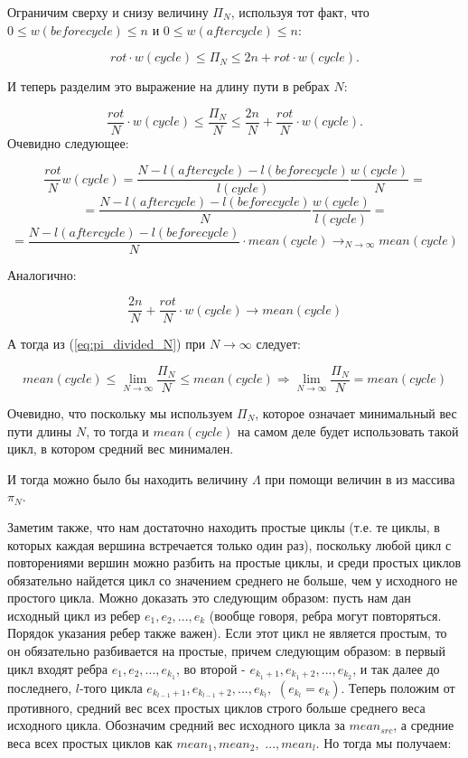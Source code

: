 \documentclass[a4paper,12pt]{report}
\theoremstyle{plain} %
\theoremstyle{definition}
\theoremstyle{remark}
\begin{document}
\begin{large}
Ограничим сверху и снизу величину $\Pi_N$, используя тот факт, что $0 \le w(beforecycle) \le n$ и $0 \le w(aftercycle) \le n$:

$$rot \cdot w(cycle) \le \Pi_N \le 2n + rot \cdot w(cycle).$$

И теперь разделим это выражение на длину пути в ребрах $N$:

\begin{equation}\label{eq:pi_divided_N}
\frac{rot}{N} \cdot w(cycle) \le \frac{\Pi_N}{N} \le \frac{2n}{N} + \frac{rot}{N} \cdot w(cycle).\end{equation}
Очевидно следующее:

$$\frac{rot}{N} w(cycle) = \frac{N - l(aftercycle) - l(beforecycle)}{l(cycle)}\frac{w(cycle)}{N}=$$
$$=\frac{N - l(aftercycle) - l(beforecycle)}{N}\frac{w(cycle)}{l(cycle)} =$$
$$= \frac{N - l(aftercycle) - l(beforecycle)}{N} \cdot mean(cycle) \rightarrow_{N \rightarrow \infty} mean(cycle)$$

Аналогично:

$$\frac{2n}{N} + \frac{rot}{N} \cdot w(cycle) \rightarrow mean(cycle)$$

А тогда из (\ref{eq:pi_divided_N}) при $N \rightarrow \infty$ следует:

$$mean(cycle) \le \lim_{N \rightarrow \infty} \frac{\Pi_N}{N} \le mean(cycle) \Rightarrow \lim_{N \rightarrow \infty}\frac{\Pi_N}{N} = mean(cycle)$$

Очевидно, что поскольку мы используем $\Pi_N$, которое означает минимальный вес пути длины $N$, то тогда и $mean(cycle)$ на самом деле будет использовать такой цикл, в котором средний вес минимален.

И тогда можно было бы находить величину $\Lambda$ при помощи величин в из массива $\pi_N$.

Заметим также, что нам достаточно находить простые циклы (т.е. те циклы, в которых каждая вершина встречается только один раз), поскольку любой цикл с повторениями вершин можно разбить на простые циклы, и среди простых циклов обязательно найдется цикл со значением среднего не больше, чем у исходного не простого цикла. Можно доказать это следующим образом: пусть нам дан исходный цикл из ребер $e_1, e_2, ..., e_k$ (вообще говоря, ребра могут повторяться. Порядок указания ребер также важен). Если этот цикл не является простым, то он обязательно разбивается на простые, причем следующим образом: в первый цикл входят ребра $e_1, e_2, ..., e_{k_1}$, во второй - $e_{k_1+1}, e_{k_1+2}, ..., e_{k_2}$, и так далее до последнего, $l$-того цикла $e_{k_{l-1}+1}, e_{k_{l-1}+2}, ..., e_{k_l},$ $(e_{k_l} = e_k)$.  Теперь положим от противного, средний вес всех простых циклов строго больше среднего веса исходного цикла. Обозначим средний вес исходного цикла за $mean_{src}$, а средние веса всех простых циклов как $mean_1, mean_2,$ $..., mean_l$. Но тогда мы получаем:


\end{large}
\end{document}
